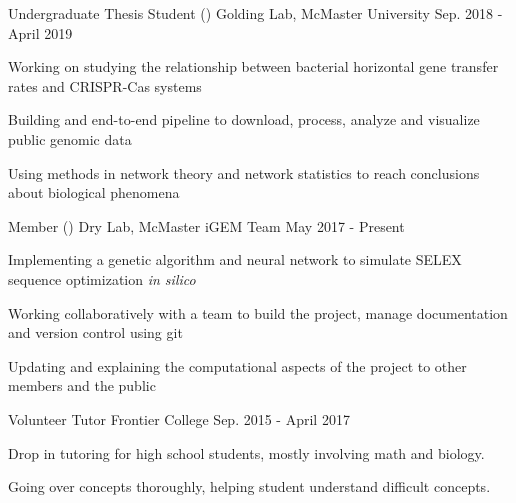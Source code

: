 \begin{cventries}
    \cventry
      {Undergraduate Thesis Student ()}
      {Golding Lab, McMaster University}
      {Sep. 2018 - April 2019}
      {}
      {
        \begin{cvitems}
         \item {Working on studying the relationship between bacterial horizontal gene transfer rates and CRISPR-Cas systems}
         \item {Building and end-to-end pipeline to download, process, analyze and visualize public genomic data}
         \item {Using methods in network theory and network statistics to reach conclusions about biological phenomena}
        \end{cvitems}
      }
	\cventry
      {Member ()}
      {Dry Lab, McMaster iGEM Team}
      {}
      {May 2017 - Present}
      {
        \begin{cvitems}
          \item{Implementing a genetic algorithm and neural network to simulate SELEX sequence optimization \textit{in silico}}
          \item{Working collaboratively with a team to build the project, manage documentation and version control using git}
          \item{Updating and explaining the computational aspects of the project to other members and the public}
        \end{cvitems}
      }
  \cventry
    {Volunteer Tutor} %
    {Frontier College}
    {} %
    {Sep. 2015 - April 2017} %
    {
      \begin{cvitems}
        \item{Drop in tutoring for high school students, mostly involving math and biology.}
        \item{Going over concepts thoroughly, helping student understand difficult concepts.}
      \end{cvitems}
    }
\end{cventries}
